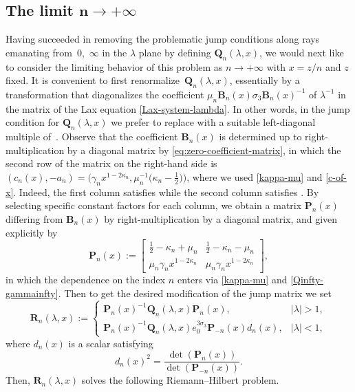 \documentclass[pdftex]{sigma}
\numberwithin{equation}{section}
\newcommand{\para}[1]{\breve{#1}}
\begin{document}
\subsection[The limit n to infinity]{The limit $\boldsymbol{n\to+\infty}$}
Having succeeded in removing the problematic jump conditions along rays emanating from~$0$,~$\infty$ in the $\lambda$ plane by defining $\mathbf{Q}_n(\lambda,x)$, we would next like to consider the limiting behavior of this problem as $n\to+\infty$ with $x=z/n$ and $z$ fixed. It is convenient to first renormalize~$\mathbf{Q}_n(\lambda,x)$, essentially by a transformation that diagonalizes the coefficient $\mu_n \mathbf{B}_n(x)\sigma_3\mathbf{B}_n(x)^{-1}$ of $\lambda^{-1}$ in the matrix of the Lax equation \eqref{Lax-system-lambda}.
In other words, in the jump condition for $\mathbf{Q}_n(\lambda,x)$ we prefer to replace \smash{$\para{\mathbf{\Phi}}_n^{(\infty)}(\lambda,x)$} with a suitable left-diagonal multiple of~\smash{$\mathbf{B}_n(x)^{-1}\para{\mathbf{\Phi}}_n^{(\infty)}(\lambda,x)$}. Observe that the coefficient $\mathbf{B}_n(x)$ is determined up to right-multiplication by a diagonal matrix by
\eqref{eq:zero-coefficient-matrix}, in which the second row of the matrix on the right-hand side is $(c_n(x),-a_n)=\big(\gamma_n x^{1-2\kappa_n},\mu_n ^{-1}\big(\kappa_n-\frac{1}{2}\big)\big)$, where we used \eqref{kappa-mu} and \eqref{c-of-x}. Indeed, the first column  satisfies  while the second column  satisfies . By selecting specific constant factors for each column, we obtain a matrix $\mathbf{P}_n(x)$ differing from $\mathbf{B}_n(x)$ by right-multiplication by a diagonal matrix, and given explicitly by
\begin{equation*}
 \mathbf{P}_n(x):=\begin{bmatrix}\frac{1}{2}-\kappa_n+\mu_n & \frac{1}{2}-\kappa_n-\mu_n \\
 \mu_n \gamma_n x^{1-2\kappa_n} & \mu_n \gamma_n x^{1-2\kappa_n}\end{bmatrix},
\end{equation*}
in which the dependence on the index $n$ enters via \eqref{kappa-mu} and \eqref{Qinfty-gammainfty}. Then to get the desired modification of the jump matrix we set
\begin{equation*}
 \mathbf{R}_n(\lambda,x):=\begin{cases}
 \mathbf{P}_n(x)^{-1}\mathbf{Q}_n(\lambda,x)\mathbf{P}_n(x),& |\lambda|>1,\\
 \mathbf{P}_n(x)^{-1}\mathbf{Q}_n(\lambda,x)e_0^{3\sigma_3}\mathbf{P}_{-n}(x)d_n(x),& |\lambda|<1,
 \end{cases}
\end{equation*}
where $d_n(x)$ is a scalar satisfying
\begin{equation}
 d_n(x)^2 = \frac{\det(\mathbf{P}_{n}(x))}{\det(\mathbf{P}_{-n}(x))}.
 \label{eq:dn-squared}
\end{equation}
Then, $\mathbf{R}_n(\lambda,x)$ solves the following
Riemann--Hilbert problem.
\end{document}
